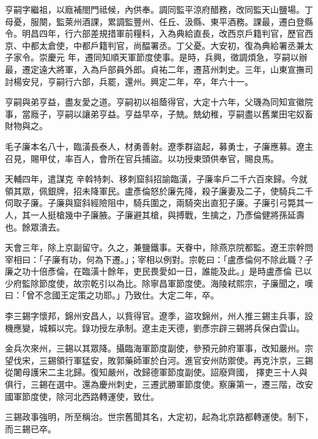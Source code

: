 \begin{pinyinscope}
 亨嗣字繼祖，以廕補閤門祗候，內供奉。調同監平涼府醋務，改同監天山鹽場。丁母憂，服闋，監萊州酒課，累調監豐州、任丘、汲縣、東平酒務。課最，遷白登縣令。明昌四年，行六部差規措軍前糧料，入為典給直長，改西京戶籍判官，歷官西京、中都太倉使，中都戶籍判官，尚醖署丞。丁父憂。大安初，復為典給署丞兼太子家令。崇慶元
 年，遷同知順天軍節度使事。是時，兵興，徵調煩急，亨嗣以辦最，遷定遠大將軍，入為戶部員外郎。貞祐二年，遷莒州刺史。三年，山東宣撫司討楊安兒，亨嗣行六部，兵罷，還州。興定二年，卒，年六十一。



 亨嗣與弟亨益，盡友愛之道。亨嗣初以祖蔭得官，大定十六年，父璣為同知宣徽院事，當廕子，亨嗣以讓弟亨益。亨益早卒，子兟。兟幼稚，亨嗣盡以舊業田宅奴畜財物與之。



 毛子廉本名八十，臨潢長泰人，材勇善射。遼季群盜起，募勇士，子廉應募。遼主召見，賜甲仗，率百人，會所在官兵捕盜。以功授東頭供奉官，賜良馬。



 天輔四年，遣謀克
 辛斡特刺、移刺窟斜招諭臨潢，子廉率戶二千六百來歸。今就領其眾，佩銀牌，招未降軍民。盧彥倫怒於廉先降，殺子廉妻及二子，使騎兵二千伺取子廉。子廉與窟斜經險阻中，騎兵圍之，兩騎突出直犯子廉。子廉引弓斃其一人，其一人挺槍幾中子廉腋。子廉避其槍，與搏戰，生擒之，乃彥倫健將孫延壽也。餘眾潰去。



 天會三年，除上京副留守。久之，兼鹽鐵事。天眷中，除燕京院都監。遼王宗幹問宰相曰：「子廉有功，何為下遷。」；宰相以例對。宗乾曰：「盧彥倫何不除此職？子廉之功十倍彥倫，在臨潢十餘年，吏民畏愛如一日，誰能及此。」是時盧彥倫
 已以少府監除節度使，故宗乾引以為比。除寧昌軍節度使。海陵弒熙宗，子廉聞之，嘆曰：「曾不念國王定策之功耶。」乃致仕。大定二年，卒。



 李三錫字懷邦，錦州安昌人，以貲得官。遼季，盜攻錦州，州人推三錫主兵事，設機應變，城賴以完。錄功授左承制。遼主走天德，劉彥宗辟三錫將兵保白雲山。



 金兵次來州，三錫以其眾降。攝臨海軍節度副使，參預元帥府軍事，改知嚴州。宗望伐宋，三錫領行軍猛安，敗郭藥師軍於白河。進官安州防禦使。再克汴京，三錫從闍母護宋二主北歸。復知嚴州，改歸德軍節度副使。詔廢齊國，
 擇吏三十人與俱行，三錫在選中。還為慶州刺史，三遷武勝軍節度使。察廉第一，遷三階，改安國軍節度使，除河北西路轉運使，致仕。



 三錫政事強明，所至稱治。世宗舊聞其名，大定初，起為北京路都轉運使。制下，而三錫已卒。




\end{pinyinscope}
